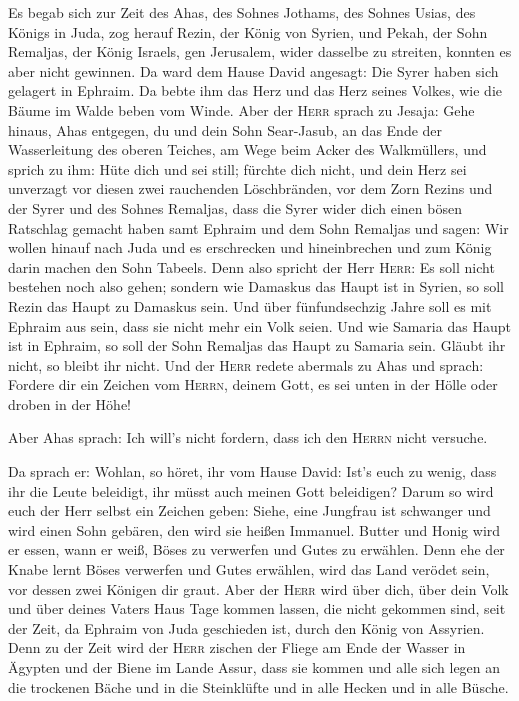  Es begab sich zur Zeit des Ahas, des Sohnes Jothams, des
Sohnes Usias, des Königs in Juda, zog herauf Rezin, der König von
Syrien, und Pekah, der Sohn Remaljas, der König Israels, gen Jerusalem,
wider dasselbe zu streiten, konnten es aber nicht gewinnen.
 Da ward dem Hause David angesagt: Die Syrer haben sich
gelagert in Ephraim. Da bebte ihm das Herz und das Herz seines Volkes,
wie die Bäume im Walde beben vom Winde.  Aber der
\textsc{Herr} sprach zu Jesaja: Gehe hinaus, Ahas entgegen, du und dein
Sohn Sear-Jasub, an das Ende der Wasserleitung des oberen Teiches, am
Wege beim Acker des Walkmüllers,  und sprich zu ihm: Hüte
dich und sei still; fürchte dich nicht, und dein Herz sei unverzagt vor
diesen zwei rauchenden Löschbränden, vor dem Zorn Rezins und der Syrer
und des Sohnes Remaljas,  dass die Syrer wider dich einen
bösen Ratschlag gemacht haben samt Ephraim und dem Sohn Remaljas und
sagen:  Wir wollen hinauf nach Juda und es erschrecken und
hineinbrechen und zum König darin machen den Sohn Tabeels.
 Denn also spricht der Herr \textsc{Herr}: Es soll nicht
bestehen noch also gehen;  sondern wie Damaskus das Haupt
ist in Syrien, so soll Rezin das Haupt zu Damaskus sein. Und über
fünfundsechzig Jahre soll es mit Ephraim aus sein, dass sie nicht mehr
ein Volk seien.  Und wie Samaria das Haupt ist in Ephraim,
so soll der Sohn Remaljas das Haupt zu Samaria sein. Gläubt ihr nicht,
so bleibt ihr nicht.  Und der \textsc{Herr} redete
abermals zu Ahas und sprach:  Fordere dir ein Zeichen vom
\textsc{Herrn}, deinem Gott, es sei unten in der Hölle oder droben in
der Höhe!

 Aber Ahas sprach: Ich will's nicht fordern, dass ich den
\textsc{Herrn} nicht versuche.

 Da sprach er: Wohlan, so höret, ihr vom Hause David:
Ist's euch zu wenig, dass ihr die Leute beleidigt, ihr müsst auch meinen
Gott beleidigen?  Darum so wird euch der Herr selbst ein
Zeichen geben: Siehe, eine Jungfrau ist schwanger und wird einen Sohn
gebären, den wird sie heißen Immanuel.  Butter und Honig
wird er essen, wann er weiß, Böses zu verwerfen und Gutes zu erwählen.
 Denn ehe der Knabe lernt Böses verwerfen und Gutes
erwählen, wird das Land verödet sein, vor dessen zwei Königen dir graut.
 Aber der \textsc{Herr} wird über dich, über dein Volk
und über deines Vaters Haus Tage kommen lassen, die nicht gekommen sind,
seit der Zeit, da Ephraim von Juda geschieden ist, durch den König von
Assyrien.  Denn zu der Zeit wird der \textsc{Herr}
zischen der Fliege am Ende der Wasser in Ägypten und der Biene im Lande
Assur,  dass sie kommen und alle sich legen an die
trockenen Bäche und in die Steinklüfte und in alle Hecken und in alle
Büsche.

